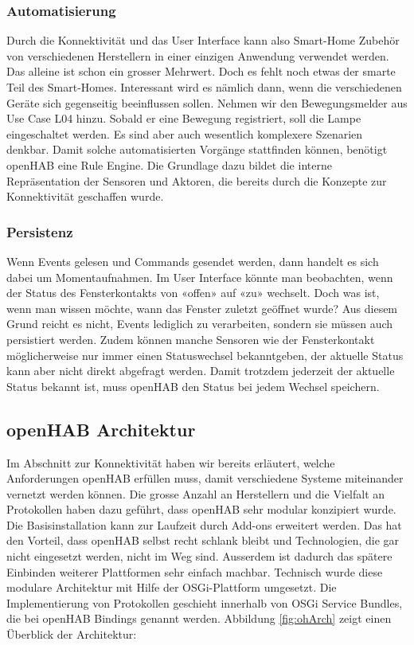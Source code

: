 \subsubsection{Automatisierung}
Durch die Konnektivität und das User Interface kann also Smart-Home Zubehör von verschiedenen Herstellern in einer einzigen Anwendung verwendet werden. Das alleine ist schon ein grosser Mehrwert. Doch es fehlt noch etwas der smarte Teil des Smart-Homes. Interessant wird es nämlich dann, wenn die verschiedenen Geräte sich gegenseitig beeinflussen sollen. Nehmen wir den Bewegungsmelder aus Use Case L04 hinzu. Sobald er eine Bewegung registriert, soll die Lampe eingeschaltet werden. Es sind aber auch wesentlich komplexere Szenarien denkbar. Damit solche automatisierten Vorgänge stattfinden können, benötigt openHAB eine Rule Engine. Die Grundlage dazu bildet die interne Repräsentation der Sensoren und Aktoren, die bereits durch die Konzepte zur Konnektivität geschaffen wurde.

\subsubsection{Persistenz}
Wenn Events gelesen und Commands gesendet werden, dann handelt es sich dabei um Momentaufnahmen. Im User Interface könnte man beobachten, wenn der Status des Fensterkontakts von «offen» auf «zu» wechselt. Doch was ist, wenn man wissen möchte, wann das Fenster zuletzt geöffnet wurde? Aus diesem Grund reicht es nicht, Events lediglich zu verarbeiten, sondern sie müssen auch persistiert werden. Zudem können manche Sensoren wie der Fensterkontakt möglicherweise nur immer einen Statuswechsel bekanntgeben, der aktuelle Status kann aber nicht direkt abgefragt werden. Damit trotzdem jederzeit der aktuelle Status bekannt ist, muss openHAB den Status bei jedem Wechsel speichern. 


\subsection{openHAB Architektur}
Im Abschnitt zur Konnektivität haben wir bereits erläutert, welche Anforderungen openHAB erfüllen muss, damit verschiedene Systeme miteinander vernetzt werden können. Die grosse Anzahl an Herstellern und die Vielfalt an Protokollen haben dazu geführt, dass openHAB sehr modular konzipiert wurde. Die Basisinstallation kann zur Laufzeit durch Add-ons erweitert werden. Das hat den Vorteil, dass openHAB selbst recht schlank bleibt und Technologien, die gar nicht eingesetzt werden, nicht im Weg sind. Ausserdem ist dadurch das spätere Einbinden weiterer Plattformen sehr einfach machbar. Technisch wurde diese modulare Architektur mit Hilfe der OSGi-Plattform umgesetzt. Die Implementierung von Protokollen geschieht innerhalb von OSGi Service Bundles, die bei openHAB Bindings genannt werden. Abbildung \ref{fig:ohArch} zeigt einen Überblick der Architektur:

